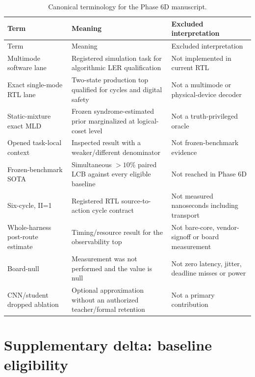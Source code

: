 \documentclass[11pt]{article}
\begin{document}
\begin{longtable}{@{}L{0.24\textwidth} L{0.25\textwidth} L{0.43\textwidth}@{}}
\caption{Canonical terminology for the Phase 6D manuscript.}\label{tab:terms}\\
\toprule
Term & Meaning & Excluded interpretation \\
\midrule
\endfirsthead
\toprule
Term & Meaning & Excluded interpretation \\
\midrule
\endhead
Multimode software lane & Registered simulation task for algorithmic LER qualification & Not implemented in current RTL \\
Exact single-mode RTL lane & Two-state production top qualified for cycles and digital safety & Not a multimode or physical-device decoder \\
Static-mixture exact MLD & Frozen syndrome-estimated prior marginalized at logical-coset level & Not a truth-privileged oracle \\
Opened task-local context & Inspected result with a weaker/different denominator & Not frozen-benchmark evidence \\
Frozen-benchmark SOTA & Simultaneous $>10\%$ paired LCB against every eligible baseline & Not reached in Phase 6D \\
Six-cycle, II=1 & Registered RTL source-to-action cycle contract & Not measured nanoseconds including transport \\
Whole-harness post-route estimate & Timing/resource result for the observability top & Not bare-core, vendor-signoff or board measurement \\
Board-null & Measurement was not performed and the value is null & Not zero latency, jitter, deadline misses or power \\
CNN/student dropped ablation & Optional approximation without an authorized teacher/formal retention & Not a primary contribution \\
\bottomrule
\end{longtable}

\section{Supplementary delta: baseline eligibility}
\end{document}
